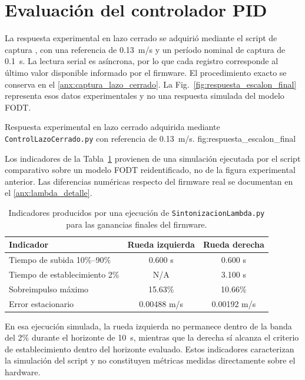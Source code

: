 \section{Evaluación del controlador PID}
\label{sec:resultados_pid}

La respuesta experimental en lazo cerrado se adquirió mediante el script de captura
, con una referencia de 0.13~m/s y un período
nominal de captura de 0.1~s. La lectura serial es asíncrona, por lo que cada
registro corresponde al último valor disponible informado por el firmware. El
procedimiento exacto se conserva en el \ref{anx:captura_lazo_cerrado}. La
Fig.~\ref{fig:respuesta_escalon_final} representa esos datos experimentales y
no una respuesta simulada del modelo FODT.

{Respuesta experimental en lazo cerrado adquirida mediante
\texttt{ControlLazoCerrado.py} con referencia de 0.13~m/s.}
{fig:respuesta_escalon_final}

Los indicadores de la Tabla~\ref{tab:pid_performance} provienen de
una simulación ejecutada por el script comparativo  sobre un modelo
FODT reidentificado, no de la figura experimental anterior. Las diferencias
numéricas respecto del firmware real se documentan en el
\ref{anx:lambda_detalle}.

\begin{table}[H]
\centering
\caption{Indicadores producidos por una ejecución de
\texttt{SintonizacionLambda.py} para las ganancias finales del firmware.}
\label{tab:pid_performance}
\small
\begin{tabular}{p{5.8cm} cc}
\toprule
\textbf{Indicador} & \textbf{Rueda izquierda} & \textbf{Rueda derecha} \\
\midrule
Tiempo de subida 10\%--90\% & 0.600 s & 0.600 s \\
Tiempo de establecimiento 2\% & N/A & 3.100 s \\
Sobreimpulso máximo & 15.63\% & 10.66\% \\
Error estacionario & 0.00488 m/s & 0.00192 m/s \\
\bottomrule
\end{tabular}
\end{table}

En esa ejecución simulada, la rueda izquierda no permanece dentro de la banda
del 2\% durante el horizonte de 10~s, mientras que la derecha sí alcanza el
criterio de establecimiento dentro del horizonte evaluado. Estos indicadores
caracterizan la simulación del script y no constituyen métricas medidas
directamente sobre el hardware.

